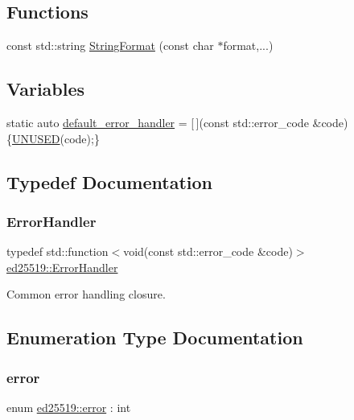 \subsection*{Functions}
\begin{DoxyCompactItemize}
\item 
const std\+::string \mbox{\hyperlink{namespaceed25519_a908061c627d853b0d7ca46bdf0082310}{String\+Format}} (const char $\ast$format,...)
\end{DoxyCompactItemize}
\subsection*{Variables}
\begin{DoxyCompactItemize}
\item 
static auto \mbox{\hyperlink{namespaceed25519_a7c7bb6ed17541162959c33ed3e3b15fb}{default\+\_\+error\+\_\+handler}} = \mbox{[}$\,$\mbox{]}(const std\+::error\+\_\+code \&code) \{\mbox{\hyperlink{ed25519_8hpp_a86d500a34c624c2cae56bc25a31b12f3}{U\+N\+U\+S\+ED}}(code);\}
\end{DoxyCompactItemize}


\subsection{Typedef Documentation}
\mbox{\label{namespaceed25519_a6ba572942b3c18591fc869d52a6b16e6}} 
\subsubsection{\texorpdfstring{ErrorHandler}{ErrorHandler}}
{\footnotesize\ttfamily typedef std\+::function$<$void(const std\+::error\+\_\+code \&code)$>$ \mbox{\hyperlink{namespaceed25519_a6ba572942b3c18591fc869d52a6b16e6}{ed25519\+::\+Error\+Handler}}}

Common error handling closure. 

\subsection{Enumeration Type Documentation}
\mbox{\label{namespaceed25519_ac93d0b5156eaca22197055e902920bc4}} 
\subsubsection{\texorpdfstring{error}{error}}
{\footnotesize\ttfamily enum \mbox{\hyperlink{namespaceed25519_ac93d0b5156eaca22197055e902920bc4}{ed25519\+::error}} \+: int}

